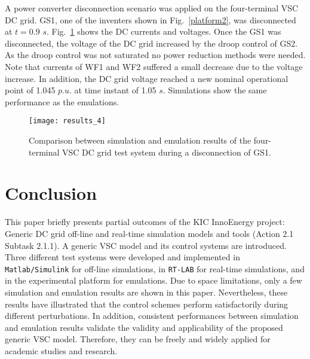 \documentclass[conference]{IEEEtran}
\begin{document}
A power converter disconnection scenario was applied on the four-terminal VSC DC grid. GS1, one of the inventers shown in Fig.~\ref{platform2}, was disconnected at $t=0.9$ $s$. Fig.~\ref{results_4} shows the DC currents and voltages. Once the GS1 was disconnected, the voltage of the DC grid increased by the droop control of GS2. As the droop control was not saturated no power reduction methods were needed. Note that currents of WF1 and WF2 suffered a small decrease due to the voltage increase. In addition, the DC grid voltage reached a new nominal operational point of 1.045 $p.u.$ at time instant of 1.05 $s$. Simulations show the same performance as the emulations.
\begin{figure}[!ht]
\centering
\texttt{[image: results\_4]}
\caption{Comparison between simulation and emulation results of the four-terminal VSC DC grid test system during a disconnection of GS1.}
\label{results_4}
\end{figure}
\section{Conclusion}
This paper briefly presents partial outcomes of the KIC InnoEnergy project: Generic DC grid off-line and real-time simulation models and tools (Action 2.1 Subtask 2.1.1). A generic VSC model and its control systems are introduced. Three different test systems were developed and implemented in \texttt{Matlab/Simulink} for off-line simulations, in \texttt{RT-LAB} for real-time simulations, and in the experimental platform for emulations. Due to space limitations, only a few simulation and emulation results are shown in this paper. Nevertheless, these results have illustrated that the control schemes perform satisfactorily during different perturbations. In addition, consistent performances between simulation and emulation results validate the validity and applicability  of the proposed generic VSC model. Therefore, they can be freely and widely applied for academic studies and research. 


%
%
%
%



\end{document}
